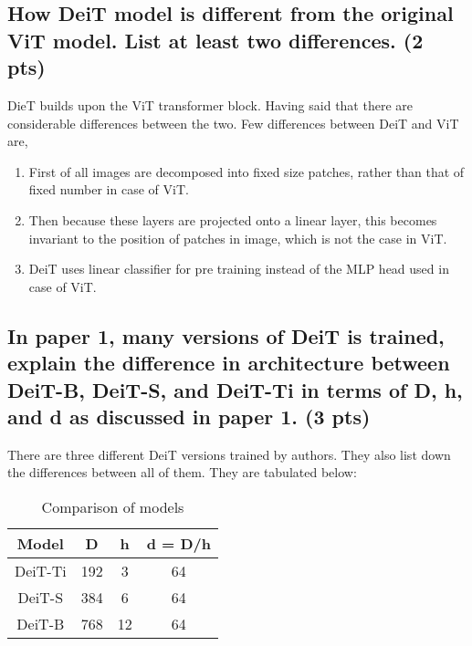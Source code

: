 \documentclass{article}
\begin{document}
\subsection{How DeiT model is different from the original ViT model. List at least two differences. (2 pts)}

DieT builds upon the ViT transformer block. Having said that there are considerable differences between the two. Few differences between DeiT and ViT are,


\begin{enumerate}
    \item  First of all images are decomposed into fixed size patches, rather than that of fixed number in case of ViT.
    \item Then because these layers are projected onto a linear layer, this becomes invariant to the position of patches in image, which is not the case in ViT.
    \item DeiT uses linear classifier for pre training instead of the MLP head used in case of ViT.
    
\end{enumerate}

\subsection{In paper 1, many versions of DeiT is trained, explain the difference in architecture between DeiT-B, DeiT-S, and DeiT-Ti in terms of D, h, and d as discussed in paper 1. (3 pts)}


There are three different DeiT versions trained by authors. They also list down the differences between all of them. They are tabulated below:

\begin{table}[h]
\begin{center}
\begin{tabular}{||c c c c||}
 \hline
 Model & D  & h & d = D/h \\ [0.5ex] \hline\hline
DeiT-Ti      &    192       &   3        &  64 \\ \hline
DeiT-S  &        384   &       6    &      64 \\ \hline
DeiT-B  &         768  &        12   &       64 \\ \hline

\end{tabular}
\end{center}
\caption{Comparison of models}
\end{table}
\end{document}
